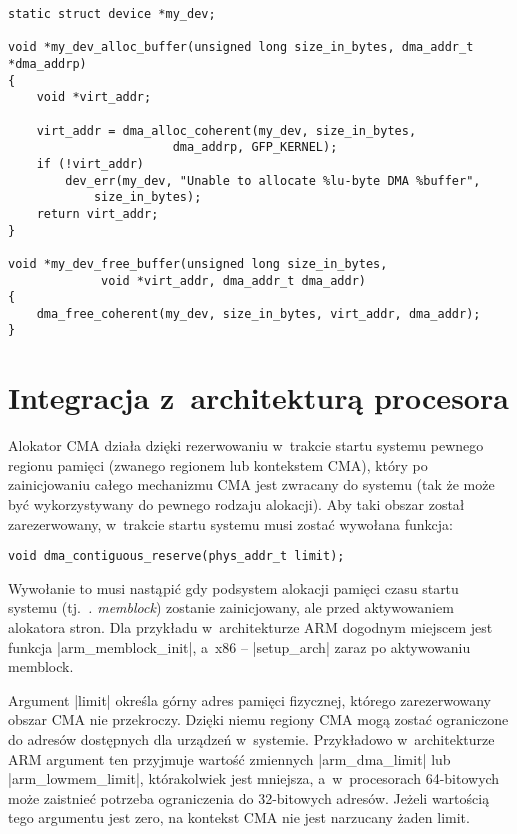 \begin{lstlisting}[float=tbhp,caption={Alokacja bufora DMA z~użyciem
      DMA API.},label=lst:dma-alloc-example]
static struct device *my_dev;

void *my_dev_alloc_buffer(unsigned long size_in_bytes, dma_addr_t *dma_addrp)
{
	void *virt_addr;

	virt_addr = dma_alloc_coherent(my_dev, size_in_bytes,
				       dma_addrp, GFP_KERNEL);
	if (!virt_addr)
		dev_err(my_dev, "Unable to allocate %lu-byte DMA %buffer",
			size_in_bytes);
	return virt_addr;
}

void *my_dev_free_buffer(unsigned long size_in_bytes,
			 void *virt_addr, dma_addr_t dma_addr)
{
	dma_free_coherent(my_dev, size_in_bytes, virt_addr, dma_addr);
}
\end{lstlisting}


\section{Integracja z~architekturą procesora}\label{sec:integrate-with-arch}

Alokator CMA działa dzięki rezerwowaniu w~trakcie startu systemu
pewnego regionu pamięci (zwanego regionem lub kontekstem CMA), który
po zainicjowaniu całego mechanizmu CMA jest zwracany do systemu (tak
że może być wykorzystywany do pewnego rodzaju alokacji).  Aby taki
obszar został zarezerwowany, w~trakcie startu systemu musi zostać
wywołana funkcja:

\begin{lstlisting}
void dma_contiguous_reserve(phys_addr_t limit);
\end{lstlisting}

Wywołanie to musi nastąpić gdy podsystem alokacji pamięci czasu startu
systemu (tj.\ {\it. memblock}) zostanie zainicjowany, ale przed
aktywowaniem alokatora stron.  Dla przykładu w~architekturze ARM
dogodnym miejscem jest funkcja \code|arm_memblock_init|, a~x86
-- \code|setup_arch| zaraz po aktywowaniu memblock.

Argument \code|limit| określa górny adres pamięci fizycznej,
którego zarezerwowany obszar CMA nie przekroczy.  Dzięki niemu regiony
CMA mogą zostać ograniczone do adresów dostępnych dla urządzeń
w~systemie.  Przykładowo w~architekturze ARM argument ten przyjmuje
wartość zmiennych \code|arm_dma_limit| lub
\code|arm_lowmem_limit|, którakolwiek jest mniejsza,
a~w~procesorach 64-bitowych może zaistnieć potrzeba ograniczenia do
32-bitowych adresów.  Jeżeli wartością tego argumentu jest zero, na
kontekst CMA nie jest narzucany żaden limit.

